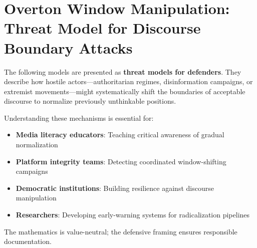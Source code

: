 
\chapter{Overton Window Manipulation: Threat Model for Discourse Boundary Attacks}
\label{ch:overton-window}

\begin{tcolorbox}[colback=red!5!white,colframe=red!75!black,title=\textbf{THREAT MODEL NOTICE},breakable]
The following models are presented as \textbf{threat models for defenders}. They describe how hostile actors---authoritarian regimes, disinformation campaigns, or extremist movements---might systematically shift the boundaries of acceptable discourse to normalize previously unthinkable positions.

Understanding these mechanisms is essential for:
\begin{itemize}
    \item \textbf{Media literacy educators}: Teaching critical awareness of gradual normalization
    \item \textbf{Platform integrity teams}: Detecting coordinated window-shifting campaigns
    \item \textbf{Democratic institutions}: Building resilience against discourse manipulation
    \item \textbf{Researchers}: Developing early-warning systems for radicalization pipelines
\end{itemize}
The mathematics is value-neutral; the defensive framing ensures responsible documentation.
\end{tcolorbox}

